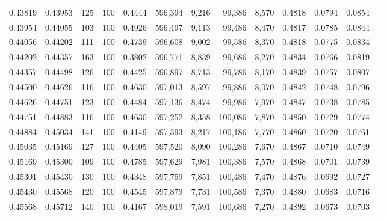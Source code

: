 \begin{tabular}{rrrrrrrrrrrrr}
0.43819 & 0.43953 &   125 & 100 &                                     0.4444 & 596,394 &   9,216 &  99,386 &   8,570 & 0.4818 & 0.0794 & 0.0854 \\
0.43954 & 0.44055 &   103 & 100 &                                     0.4926 & 596,497 &   9,113 &  99,486 &   8,470 & 0.4817 & 0.0785 & 0.0844 \\
0.44056 & 0.44202 &   111 & 100 &                                     0.4739 & 596,608 &   9,002 &  99,586 &   8,370 & 0.4818 & 0.0775 & 0.0834 \\
0.44202 & 0.44357 &   163 & 100 &                                     0.3802 & 596,771 &   8,839 &  99,686 &   8,270 & 0.4834 & 0.0766 & 0.0819 \\
0.44357 & 0.44498 &   126 & 100 &                                     0.4425 & 596,897 &   8,713 &  99,786 &   8,170 & 0.4839 & 0.0757 & 0.0807 \\
0.44500 & 0.44626 &   116 & 100 &                                     0.4630 & 597,013 &   8,597 &  99,886 &   8,070 & 0.4842 & 0.0748 & 0.0796 \\
0.44626 & 0.44751 &   123 & 100 &                                     0.4484 & 597,136 &   8,474 &  99,986 &   7,970 & 0.4847 & 0.0738 & 0.0785 \\
0.44751 & 0.44883 &   116 & 100 &                                     0.4630 & 597,252 &   8,358 & 100,086 &   7,870 & 0.4850 & 0.0729 & 0.0774 \\
0.44884 & 0.45034 &   141 & 100 &                                     0.4149 & 597,393 &   8,217 & 100,186 &   7,770 & 0.4860 & 0.0720 & 0.0761 \\
0.45035 & 0.45169 &   127 & 100 &                                     0.4405 & 597,520 &   8,090 & 100,286 &   7,670 & 0.4867 & 0.0710 & 0.0749 \\
0.45169 & 0.45300 &   109 & 100 &                                     0.4785 & 597,629 &   7,981 & 100,386 &   7,570 & 0.4868 & 0.0701 & 0.0739 \\
0.45301 & 0.45430 &   130 & 100 &                                     0.4348 & 597,759 &   7,851 & 100,486 &   7,470 & 0.4876 & 0.0692 & 0.0727 \\
0.45430 & 0.45568 &   120 & 100 &                                     0.4545 & 597,879 &   7,731 & 100,586 &   7,370 & 0.4880 & 0.0683 & 0.0716 \\
0.45568 & 0.45712 &   140 & 100 &                                     0.4167 & 598,019 &   7,591 & 100,686 &   7,270 & 0.4892 & 0.0673 & 0.0703 \\

\end{tabular}

